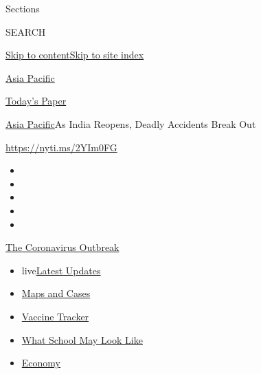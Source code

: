 Sections

SEARCH

\protect\hyperlink{site-content}{Skip to
content}\protect\hyperlink{site-index}{Skip to site index}

\href{https://www.nytimes.com/section/world/asia}{Asia Pacific}

\href{https://myaccount.nytimes.com/auth/login?response_type=cookie\&client_id=vi}{}

\href{https://www.nytimes.com/section/todayspaper}{Today's Paper}

\href{/section/world/asia}{Asia Pacific}\textbar{}As India Reopens,
Deadly Accidents Break Out

\url{https://nyti.ms/2YIm0FG}

\begin{itemize}
\item
\item
\item
\item
\item
\end{itemize}

\href{https://www.nytimes.com/news-event/coronavirus?action=click\&pgtype=Article\&state=default\&region=TOP_BANNER\&context=storylines_menu}{The
Coronavirus Outbreak}

\begin{itemize}
\tightlist
\item
  live\href{https://www.nytimes.com/2020/08/02/world/coronavirus-updates.html?action=click\&pgtype=Article\&state=default\&region=TOP_BANNER\&context=storylines_menu}{Latest
  Updates}
\item
  \href{https://www.nytimes.com/interactive/2020/us/coronavirus-us-cases.html?action=click\&pgtype=Article\&state=default\&region=TOP_BANNER\&context=storylines_menu}{Maps
  and Cases}
\item
  \href{https://www.nytimes.com/interactive/2020/science/coronavirus-vaccine-tracker.html?action=click\&pgtype=Article\&state=default\&region=TOP_BANNER\&context=storylines_menu}{Vaccine
  Tracker}
\item
  \href{https://www.nytimes.com/interactive/2020/07/29/us/schools-reopening-coronavirus.html?action=click\&pgtype=Article\&state=default\&region=TOP_BANNER\&context=storylines_menu}{What
  School May Look Like}
\item
  \href{https://www.nytimes.com/live/2020/07/31/business/stock-market-today-coronavirus?action=click\&pgtype=Article\&state=default\&region=TOP_BANNER\&context=storylines_menu}{Economy}
\end{itemize}

